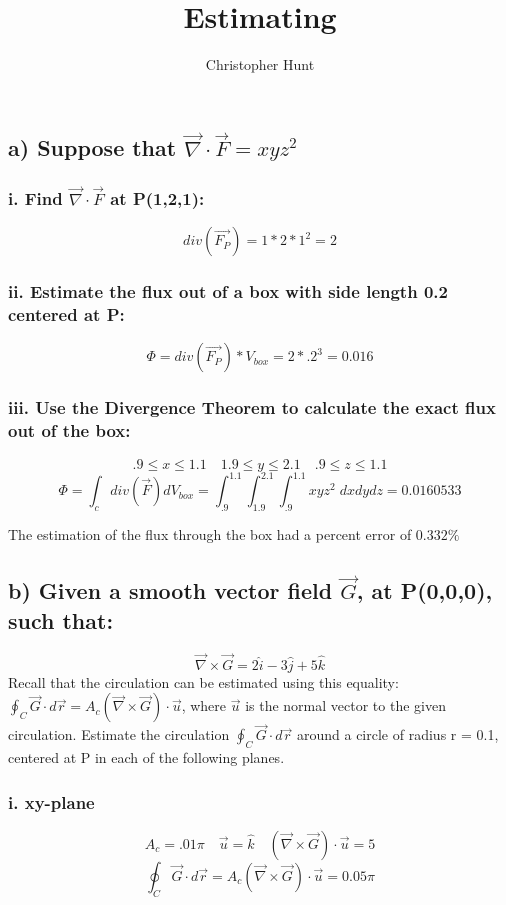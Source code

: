 \documentclass[11pt]{article}
\title{Estimating}
\author{Christopher Hunt}
\date{}
\begin{document}
\pagestyle{fancy}
\fancyhf{}
\rhead{\thepage}
\maketitle

\subsection*{a) Suppose that $\vec{\nabla}\cdot\vec{F} = xyz^2$}
\subsubsection*{i. Find $\vec{\nabla}\cdot\vec{F}$ at P(1,2,1):}
$$div(\vec{F_P}) = 1*2*1^2 = 2$$
\subsubsection*{ii. Estimate the flux out of a box with side length 0.2 centered at P:}
$$\Phi = div(\vec{F_P})*V_{box} = 2 * .2^3 = 0.016$$
\subsubsection*{iii. Use the Divergence Theorem to calculate the exact flux out of the box:}
$$.9 \leq x \leq 1.1 \quad 1.9 \leq y \leq 2.1 \quad .9 \leq z \leq 1.1$$
$$\Phi = \int_c div(\vec{F})dV_{box} = \int_{.9}^{1.1}\int_{1.9}^{2.1}\int_{.9}^{1.1}xyz^2\;dxdydz = 0.0160533$$

The estimation of the flux through the box had a percent error of $0.332\%$

\subsection*{b) Given a smooth vector field $\vec{G}$, at P(0,0,0), such that:}
$$\vec{\nabla} \times \vec{G} = 2\hat{i} - 3\hat{j} + 5\hat{k}$$
Recall that the circulation can be estimated using this equality: $\oint_C \vec{G}\cdot d\vec{r} = A_c(\vec{\nabla}\times\vec{G})\cdot\vec{u}$, where $\vec{u}$ is the normal vector to the given circulation.
Estimate the circulation $\oint_C \vec{G}\cdot d\vec{r}$ around a circle of radius r = 0.1, centered at P in each of the following planes.
\subsubsection*{i. xy-plane}
$$A_c = .01\pi \quad \vec{u} = \hat{k} \quad (\vec{\nabla}\times\vec{G})\cdot\vec{u} = 5$$
$$\oint_C \vec{G}\cdot d\vec{r} = A_c(\vec{\nabla}\times\vec{G})\cdot\vec{u} = 0.05 \pi$$
\end{document}
